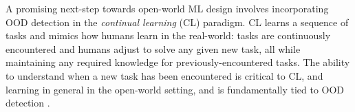 
A promising next-step towards open-world ML design involves incorporating OOD detection in the \textit{continual learning} (CL) paradigm. CL learns a sequence of tasks \cite{de2021continual,kim2022theoretical} and mimics how humans learn in the real-world: tasks are continuously encountered and humans adjust to solve any given new task, all while maintaining any required knowledge for previously-encountered tasks. The ability to understand when a new task has been encountered is critical to CL, and learning in general in the open-world setting, and is fundamentally tied to OOD detection \cite{kim2022theoretical}.



